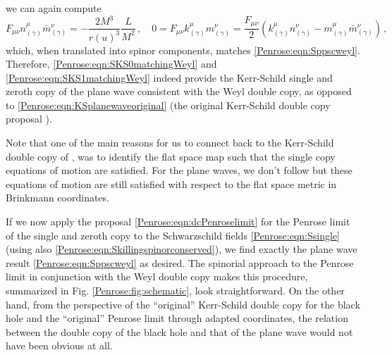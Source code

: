 we can again compute
\begin{equation}
F_{\mu \nu} n^{\mu}_{(\gamma)} \bar{m}^{\nu}_{(\gamma)} =   -\frac{2  M^3}{r(u)^3}  \frac{L}{M^2}  \, , \quad	0 = F_{\mu \nu} k^{\mu}_{(\gamma)} m^{\nu}_{(\gamma)} = \frac{F_{\mu \nu}}{2} \left(k_{(\gamma)}^{\mu} n_{(\gamma)}^{\nu} - m_{(\gamma)}^{\mu}\bar{m}_{(\gamma)}^{\nu}\right)   \, ,
\end{equation}
which, when translated into spinor components, matches \eqref{Penrose:eqn:Sppscweyl}. Therefore, \eqref{Penrose:eqn:SKS0matchingWeyl} and \eqref{Penrose:eqn:SKS1matchingWeyl} indeed provide the Kerr-Schild single and zeroth copy of the plane wave consistent with the Weyl double copy, as opposed to \eqref{Penrose:eqn:KSplanewaveoriginal} (the original Kerr-Schild double copy proposal \cite{Monteiro:2014cda}).

Note that one of the main reasons for us to connect back to the Kerr-Schild double copy of \cite{Monteiro:2014cda}, was to identify the flat space map such that the single copy equations of motion are satisfied. For the plane waves, we don't follow  \cite{Monteiro:2014cda} but these equations of motion are still satisfied with respect to the flat space metric in Brinkmann coordinates. 

If we now apply the proposal \eqref{Penrose:eqn:dcPenroselimit} for the Penrose limit of the single and zeroth copy to the Schwarzschild fields \eqref{Penrose:eqn:Ssingle} (using also \eqref{Penrose:eqn:Skillingspinorconserved}), we find exactly the plane wave result \eqref{Penrose:eqn:Sppscweyl} as desired. The spinorial approach to the Penrose limit in conjunction with the Weyl double copy makes this procedure, summarized in Fig. \ref{Penrose:fig:schematic}, look straightforward. On the other hand, from the perspective of the ``original'' Kerr-Schild double copy for the black hole and the ``original'' Penrose limit through adapted coordinates, the relation between the double copy of the black hole and that of the plane wave would not have been obvious at all.

